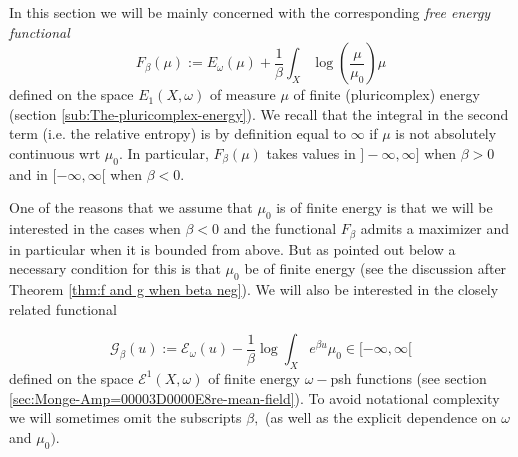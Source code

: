 \documentclass[11pt,oneside,english]{amsart}
\numberwithin{equation}{section}
\numberwithin{figure}{section}
\theoremstyle{plain}
\theoremstyle{plain}
\theoremstyle{plain}
\theoremstyle{plain}
\theoremstyle{remark}
\theoremstyle{definition}
\begin{document}
In this section we will be mainly concerned with the corresponding
\emph{free energy functional} 
\[
F_{\beta}(\mu):=E_{\omega}(\mu)+\frac{1}{\beta}\int_{X}\log(\frac{\mu}{\mu_{0}})\mu
\]
 defined on the space $E_{1}(X,\omega)$ of measure $\mu$ of finite
(pluricomplex) energy (section \ref{sub:The-pluricomplex-energy}).
We recall that the integral in the second term (i.e. the relative
entropy) is by definition equal to $\infty$ if $\mu$ is not absolutely
continuous wrt $\mu_{0}.$ In particular, $F_{\beta}(\mu)$ takes
values in $]-\infty,\infty]$ when $\beta>0$ and in $[-\infty,\infty[$
when $\beta<0.$

One of the reasons that we assume that $\mu_{0}$ is of finite energy
is that we will be interested in the cases when $\beta<0$ and the
functional $F_{\beta}$ admits a maximizer and in particular when
it is bounded from above. But as pointed out below a necessary condition
for this is that $\mu_{0}$ be of finite energy (see the discussion
after Theorem \ref{thm:f and g when beta neg}). We will also be interested
in the closely related functional

\[
\mathcal{G}_{\beta}(u):=\mathcal{E}_{\omega}(u)-\frac{1}{\beta}\log\int_{X}e^{\beta u}\mu_{0}\in[-\infty,\infty[
\]
 defined on the space $\mathcal{E}^{1}(X,\omega)$ of finite energy
$\omega-$psh functions (see section \ref{sec:Monge-Amp=00003D0000E8re-mean-field}).
To avoid notational complexity we will sometimes omit the subscripts
$\beta,$ (as well as the explicit dependence on $\omega$ and $\mu_{0})$. 
\end{document}
